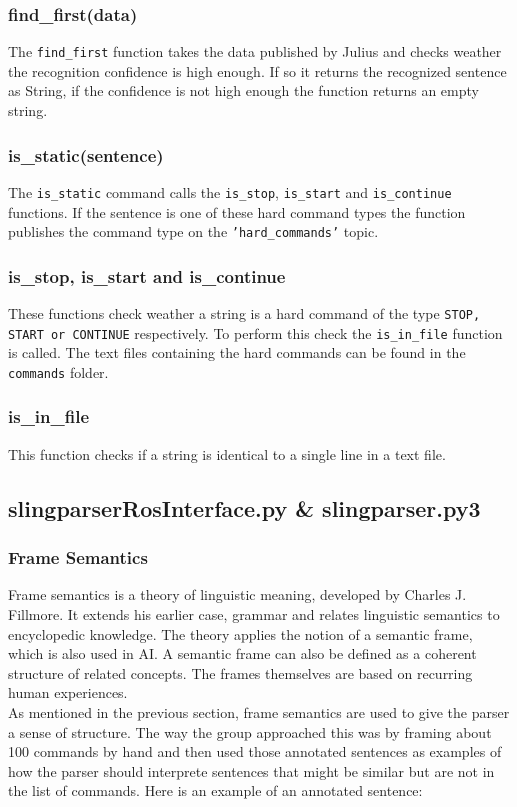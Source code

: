 \documentclass[main.tex]{subfiles}
\begin{document}
		\subsubsection{find\_first(data)}
		The \texttt{find\_first} function takes the data published by Julius and checks weather the recognition confidence is high enough. If so it returns the recognized sentence as String, if the confidence is not high enough the function returns an empty string.\\
        
        \subsubsection{is\_static(sentence)}
        The \texttt{is\_static} command calls the \texttt{is\_stop}, \texttt{is\_start} and \texttt{is\_continue} functions. If the sentence is one of these hard command types the function publishes the command type on the \texttt{'hard\_commands'} topic.
        
		\subsubsection{is\_stop, is\_start and is\_continue}
        These functions check weather a string is a hard command of the type \texttt{STOP, START or CONTINUE} respectively. To perform this check the \texttt{is\_in\_file} function is called. The text files containing the hard commands can be found in the \texttt{commands} folder.
        
        \subsubsection{is\_in\_file}
        This function checks if a string is identical to a single line in a text file.
        
		\subsection{slingparserRosInterface.py \& slingparser.py3}	
        \subsubsection{Frame Semantics}
        Frame semantics is a theory of linguistic meaning, developed by Charles J. Fillmore. It extends his earlier case, grammar and relates linguistic semantics to encyclopedic knowledge. The theory applies the notion of a semantic frame, which is also used in AI. A semantic frame can also be defined as a coherent structure of related concepts. The frames themselves are based on recurring human experiences.\\
        As mentioned in the previous section, frame semantics are used to give the parser a sense of structure. The way the group approached this was by framing about 100 commands by hand and then used those annotated sentences as examples of how the parser should interprete sentences that might be similar but are not in the list of commands. 
        Here is an example of an annotated sentence: 
        
\end{document}
